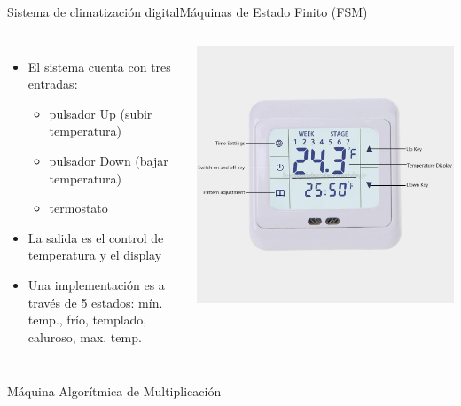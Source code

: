 \documentclass[aspectratio=169,compress]{beamer}
\begin{document}
\begin{footnotesize}
\begin{frame}{Sistema de climatización digital}{Máquinas de Estado Finito (FSM)}
\begin{columns}[onlytextwidth,T]
\column{\dimexpr\linewidth-60mm-5mm}
\bigskip
\bigskip
\begin{itemize}
\item El sistema cuenta con tres entradas: 
\begin{itemize}
\item pulsador Up (subir temperatura)
\item pulsador Down (bajar temperatura)
\item termostato
\end{itemize}
\item La salida es el control de temperatura y el display
\bigskip
\item Una implementación es a través de 5 estados: mín. temp., frío, templado, caluroso, max. temp.
\end{itemize}
       \column{60mm}
\includegraphics[scale=0.2]{images/temp.jpg} 
    \end{columns}
\end{frame}





\begin{frame}{Máquina Algorítmica de Multiplicación}
\begin{columns}[onlytextwidth,T]
\column{\dimexpr\linewidth-70mm-5mm}
\bigskip
\bigskip


\end{columns}
\end{frame}
\end{footnotesize}
\end{document}
